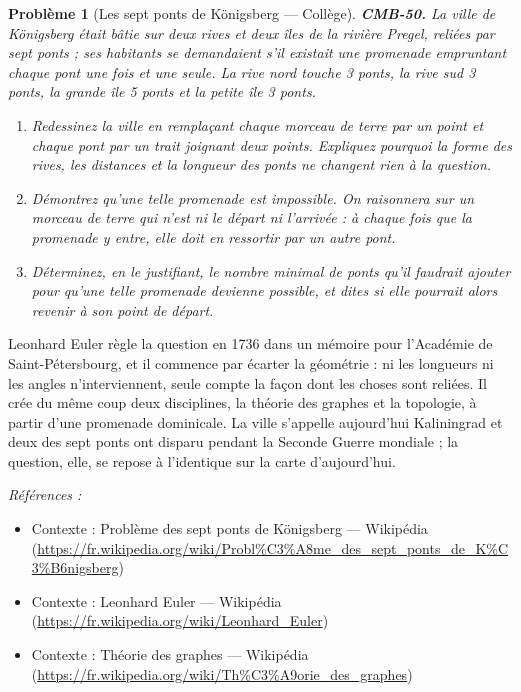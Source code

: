 \documentclass[11pt]{article}
\newtheorem{problem}{Problème}
\newenvironment{refs}{\par\small\noindent\emph{Références :}\begin{itemize}\setlength\itemsep{0pt}}{\end{itemize}\normalsize}
\begin{document}
\bigskip

\begin{problem}[{Les sept ponts de Königsberg --- Collège}]
\textbf{CMB-50.} La ville de Königsberg était bâtie sur deux rives et deux îles de la rivière
Pregel, reliées par sept ponts ; ses habitants se demandaient s'il existait une promenade
empruntant chaque pont une fois et une seule. La rive nord touche 3 ponts, la rive sud 3 ponts, la
grande île 5 ponts et la petite île 3 ponts.
\begin{enumerate}
\item[(a)] Redessinez la ville en remplaçant chaque morceau de terre par un point et chaque pont par un
trait joignant deux points. Expliquez pourquoi la forme des rives, les distances et la longueur des
ponts ne changent rien à la question.
\item[(b)] Démontrez qu'une telle promenade est impossible. On raisonnera sur un morceau de terre qui
n'est ni le départ ni l'arrivée : à chaque fois que la promenade y entre, elle doit en ressortir
par un autre pont.
\item[(c)] Déterminez, en le justifiant, le nombre minimal de ponts qu'il faudrait ajouter pour qu'une
telle promenade devienne possible, et dites si elle pourrait alors revenir à son point de
départ.
\end{enumerate}

\end{problem}

\noindent Leonhard Euler règle la question en 1736 dans un mémoire pour
l'Académie de Saint-Pétersbourg, et il commence par écarter la géométrie : ni les longueurs ni les
angles n'interviennent, seule compte la façon dont les choses sont reliées. Il crée du même coup
deux disciplines, la théorie des graphes et la topologie, à partir d'une promenade dominicale. La
ville s'appelle aujourd'hui Kaliningrad et deux des sept ponts ont disparu pendant la Seconde
Guerre mondiale ; la question, elle, se repose à l'identique sur la carte d'aujourd'hui.

\begin{refs}
\item Contexte : Problème des sept ponts de Königsberg --- Wikipédia (\url{https://fr.wikipedia.org/wiki/Probl%C3%A8me_des_sept_ponts_de_K%C3%B6nigsberg})
\item Contexte : Leonhard Euler --- Wikipédia (\url{https://fr.wikipedia.org/wiki/Leonhard_Euler})
\item Contexte : Théorie des graphes --- Wikipédia (\url{https://fr.wikipedia.org/wiki/Th%C3%A9orie_des_graphes})
\end{refs}
\end{document}
